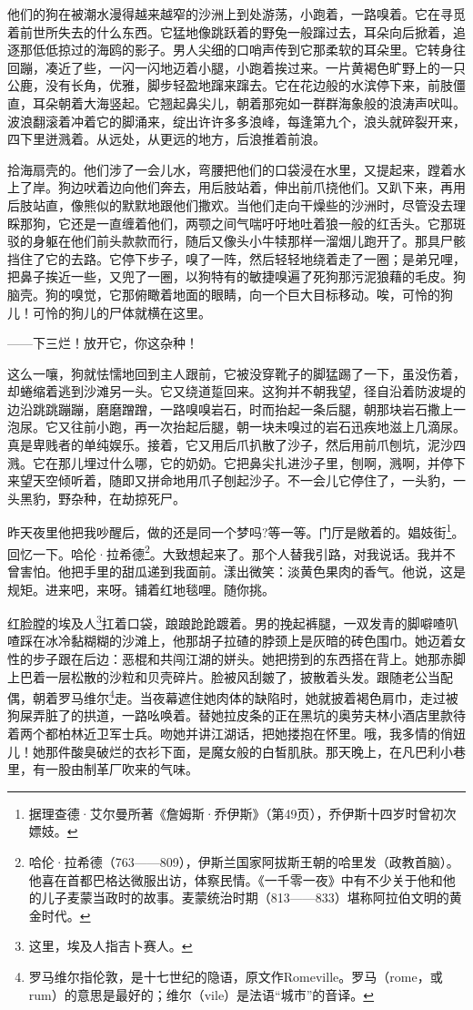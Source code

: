 \par 他们的狗在被潮水漫得越来越窄的沙洲上到处游荡，小跑着，一路嗅着。它在寻觅着前世所失去的什么东西。它猛地像跳跃着的野兔一般蹿过去，耳朵向后掀着，追逐那低低掠过的海鸥的影子。男人尖细的口哨声传到它那柔软的耳朵里。它转身往回蹦，凑近了些，一闪一闪地迈着小腿，小跑着挨过来。一片黄褐色旷野上的一只公鹿，没有长角，优雅，脚步轻盈地蹿来蹿去。它在花边般的水滨停下来，前肢僵直，耳朵朝着大海竖起。它翘起鼻尖儿，朝着那宛如一群群海象般的浪涛声吠叫。波浪翻滚着冲着它的脚涌来，绽出许许多多浪峰，每逢第九个，浪头就碎裂开来，四下里迸溅着。从远处，从更远的地方，后浪推着前浪。
\par 拾海扇壳的。他们涉了一会儿水，弯腰把他们的口袋浸在水里，又提起来，蹚着水上了岸。狗边吠着边向他们奔去，用后肢站着，伸出前爪挠他们。又趴下来，再用后肢站直，像熊似的默默地跟他们撒欢。当他们走向干燥些的沙洲时，尽管没去理睬那狗，它还是一直缠着他们，两颚之间气喘吁吁地吐着狼一般的红舌头。它那斑驳的身躯在他们前头款款而行，随后又像头小牛犊那样一溜烟儿跑开了。那具尸骸挡住了它的去路。它停下步子，嗅了一阵，然后轻轻地绕着走了一圈；是弟兄哩，把鼻子挨近一些，又兜了一圈，以狗特有的敏捷嗅遍了死狗那污泥狼藉的毛皮。狗脑壳。狗的嗅觉，它那俯瞰着地面的眼睛，向一个巨大目标移动。唉，可怜的狗儿！可怜的狗儿的尸体就横在这里。
\par ——下三烂！放开它，你这杂种！
\par 这么一嚷，狗就怯懦地回到主人跟前，它被没穿靴子的脚猛踢了一下，虽没伤着，却蜷缩着逃到沙滩另一头。它又绕道踅回来。这狗并不朝我望，径自沿着防波堤的边沿跳跳蹦蹦，磨磨蹭蹭，一路嗅嗅岩石，时而抬起一条后腿，朝那块岩石撒上一泡尿。它又往前小跑，再一次抬起后腿，朝一块未嗅过的岩石迅疾地滋上几滴尿。真是卑贱者的单纯娱乐。接着，它又用后爪扒散了沙子，然后用前爪刨坑，泥沙四溅。它在那儿埋过什么哪，它的奶奶。它把鼻尖扎进沙子里，刨啊，溅啊，并停下来望天空倾听着，随即又拼命地用爪子刨起沙子。不一会儿它停住了，一头豹，一头黑豹，野杂种，在劫掠死尸。
\par 昨天夜里他把我吵醒后，做的还是同一个梦吗?等一等。门厅是敞着的。娼妓街\footnote{据理查德·艾尔曼所著《詹姆斯·乔伊斯》（第49页），乔伊斯十四岁时曾初次嫖妓。}。回忆一下。哈伦·拉希德\footnote{哈伦·拉希德（763——809），伊斯兰国家阿拔斯王朝的哈里发（政教首脑）。他喜在首都巴格达微服出访，体察民情。《一千零一夜》中有不少关于他和他的儿子麦蒙当政时的故事。麦蒙统治时期（813——833）堪称阿拉伯文明的黄金时代。}。大致想起来了。那个人替我引路，对我说话。我并不曾害怕。他把手里的甜瓜递到我面前。漾出微笑：淡黄色果肉的香气。他说，这是规矩。进来吧，来呀。铺着红地毯哩。随你挑。
\par 红脸膛的埃及人\footnote{这里，埃及人指吉卜赛人。}扛着口袋，踉踉跄跄踱着。男的挽起裤腿，一双发青的脚噼喳叭喳踩在冰冷黏糊糊的沙滩上，他那胡子拉碴的脖颈上是灰暗的砖色围巾。她迈着女性的步子跟在后边：恶棍和共闯江湖的姘头。她把捞到的东西搭在背上。她那赤脚上巴着一层松散的沙粒和贝壳碎片。脸被风刮皴了，披散着头发。跟随老公当配偶，朝着罗马维尔\footnote{罗马维尔指伦敦，是十七世纪的隐语，原文作Romeville。罗马（rome，或rum）的意思是最好的；维尔（vile）是法语“城市”的音译。}走。当夜幕遮住她肉体的缺陷时，她就披着褐色肩巾，走过被狗屎弄脏了的拱道，一路吆唤着。替她拉皮条的正在黑坑的奥劳夫林小酒店里款待着两个都柏林近卫军士兵。吻她并讲江湖话，把她搂抱在怀里。哦，我多情的俏妞儿！她那件酸臭破烂的衣衫下面，是魔女般的白皙肌肤。那天晚上，在凡巴利小巷里，有一股由制革厂吹来的气味。
